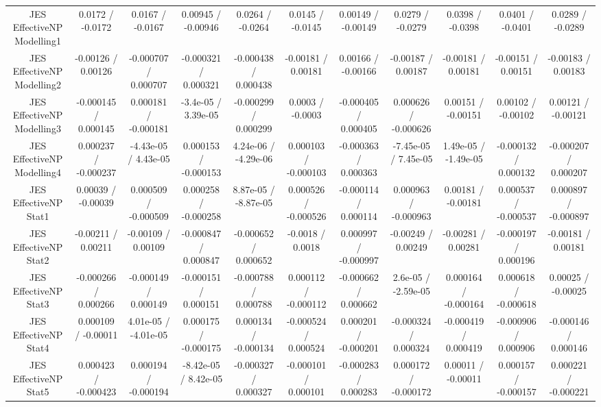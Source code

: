 \begin{table}[htbp]
\begin{center}
\begin{tabular}{|c|c|c|c|c|c|c|c|c|c|c|}
  JES EffectiveNP Modelling1 & 0.0172 / -0.0172 & 0.0167 / -0.0167 & 0.00945 / -0.00946 & 0.0264 / -0.0264 & 0.0145 / -0.0145 & 0.00149 / -0.00149 & 0.0279 / -0.0279 & 0.0398 / -0.0398 & 0.0401 / -0.0401 & 0.0289 / -0.0289 \\ 
  JES EffectiveNP Modelling2 & -0.00126 / 0.00126 & -0.000707 / 0.000707 & -0.000321 / 0.000321 & -0.000438 / 0.000438 & -0.00181 / 0.00181 & 0.00166 / -0.00166 & -0.00187 / 0.00187 & -0.00181 / 0.00181 & -0.00151 / 0.00151 & -0.00183 / 0.00183 \\ 
  JES EffectiveNP Modelling3 & -0.000145 / 0.000145 & 0.000181 / -0.000181 & -3.4e-05 / 3.39e-05 & -0.000299 / 0.000299 & 0.0003 / -0.0003 & -0.000405 / 0.000405 & 0.000626 / -0.000626 & 0.00151 / -0.00151 & 0.00102 / -0.00102 & 0.00121 / -0.00121 \\ 
  JES EffectiveNP Modelling4 & 0.000237 / -0.000237 & -4.43e-05 / 4.43e-05 & 0.000153 / -0.000153 & 4.24e-06 / -4.29e-06 & 0.000103 / -0.000103 & -0.000363 / 0.000363 & -7.45e-05 / 7.45e-05 & 1.49e-05 / -1.49e-05 & -0.000132 / 0.000132 & -0.000207 / 0.000207 \\ 
  JES EffectiveNP Stat1 & 0.00039 / -0.00039 & 0.000509 / -0.000509 & 0.000258 / -0.000258 & 8.87e-05 / -8.87e-05 & 0.000526 / -0.000526 & -0.000114 / 0.000114 & 0.000963 / -0.000963 & 0.00181 / -0.00181 & 0.000537 / -0.000537 & 0.000897 / -0.000897 \\ 
  JES EffectiveNP Stat2 & -0.00211 / 0.00211 & -0.00109 / 0.00109 & -0.000847 / 0.000847 & -0.000652 / 0.000652 & -0.0018 / 0.0018 & 0.000997 / -0.000997 & -0.00249 / 0.00249 & -0.00281 / 0.00281 & -0.000197 / 0.000196 & -0.00181 / 0.00181 \\ 
  JES EffectiveNP Stat3 & -0.000266 / 0.000266 & -0.000149 / 0.000149 & -0.000151 / 0.000151 & -0.000788 / 0.000788 & 0.000112 / -0.000112 & -0.000662 / 0.000662 & 2.6e-05 / -2.59e-05 & 0.000164 / -0.000164 & 0.000618 / -0.000618 & 0.00025 / -0.00025 \\ 
  JES EffectiveNP Stat4 & 0.000109 / -0.00011 & 4.01e-05 / -4.01e-05 & 0.000175 / -0.000175 & 0.000134 / -0.000134 & -0.000524 / 0.000524 & 0.000201 / -0.000201 & -0.000324 / 0.000324 & -0.000419 / 0.000419 & -0.000906 / 0.000906 & -0.000146 / 0.000146 \\ 
  JES EffectiveNP Stat5 & 0.000423 / -0.000423 & 0.000194 / -0.000194 & -8.42e-05 / 8.42e-05 & -0.000327 / 0.000327 & -0.000101 / 0.000101 & -0.000283 / 0.000283 & 0.000172 / -0.000172 & 0.00011 / -0.00011 & 0.000157 / -0.000157 & 0.000221 / -0.000221 \\ 

\end{tabular}
\end{center}
\end{table}

